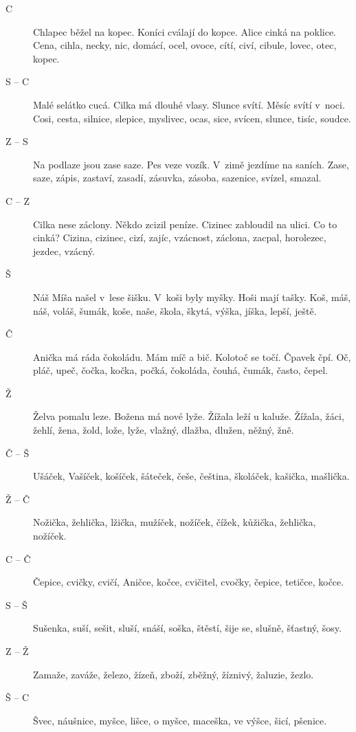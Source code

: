 \begin{multicols}{\value{columnsgames}}
\begin{description}
\item[C] Chlapec běžel na kopec. Koníci cválají do kopce. Alice cinká 
na poklice. Cena, cihla, necky, nic, domácí, ocel, ovoce, cítí, civí,
cibule, lovec, otec, kopec.

\item[S -- C] Malé selátko cucá. Cilka má dlouhé vlasy. Slunce svítí. 
Měsíc svítí v~noci. Cosi, cesta, silnice, slepice, myslivec, ocas,
sice, svícen, slunce, tisíc, soudce.

\item[Z -- S] Na podlaze jsou zase saze. Pes veze vozík. V~zimě 
jezdíme na saních. Zase, saze, zápis, zastaví, zasadí, zásuvka, zásoba, sazenice, svízel, smazal.

\item[C -- Z] Cilka nese záclony. Někdo zcizil peníze. Cizinec zabloudil 
na ulici. Co to cinká? Cizina, cizinec, cizí, zajíc, vzácnost, záclona,
zacpal, horolezec, jezdec, vzácný.

\item[Š] Náš Míša našel v~lese šišku. V~koši byly myšky. Hoši mají tašky.
Koš, máš, náš, voláš, šumák, koše, naše, škola, škytá, výška, jíška,
lepší, ještě.

\item[Č] Anička má ráda čokoládu. Mám míč a bič. Kolotoč se točí. Čpavek 
čpí. Oč, pláč, upeč, čočka, kočka, počká, čokoláda, čouhá, čumák, často,
čepel.

\item[Ž] Želva pomalu leze. Božena má nové lyže. Žížala leží u kaluže.
Žížala, žáci, žehlí, žena, žold, lože, lyže, vlažný, dlažba, dlužen, něžný,
žně.

\item[Č -- Š] Ušáček, Vašíček, košíček, šáteček, češe, čeština, školáček, 
kašička, mašlička.

\item[Ž -- Č] Nožička, žehlička, lžička, mužíček, nožíček, čížek, kůžička, 
žehlička, nožíček.

\item[C -- Č] Čepice, cvičky, cvičí, Aničce, kočce, cvičitel, cvočky, 
čepice, tetičce, kočce.

\item[S -- Š] Sušenka, suší, sešit, sluší, snáší, soška, štěstí, šije 
se, slušně, šťastný, šosy.

\item[Z -- Ž] Zamaže, zaváže, železo, žízeň, zboží, zběžný, žíznivý,
žaluzie, žezlo.

\item[Š -- C] Švec, náušnice, myšce, lišce, o myšce, maceška, ve výšce, 
šicí, pšenice.


\end{description}
\end{multicols}
